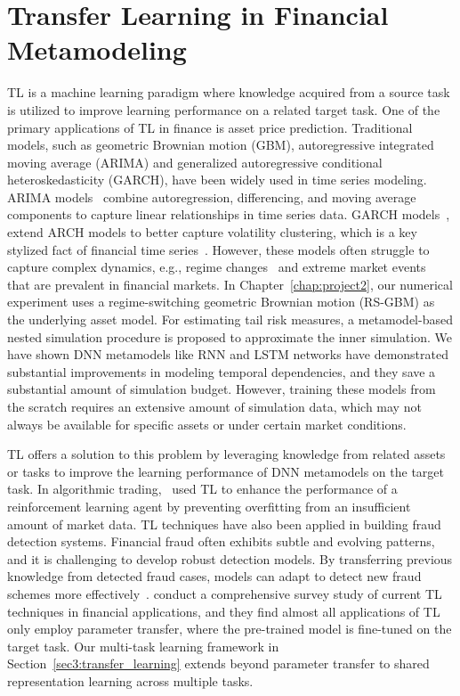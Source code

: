 \section{Transfer Learning in Financial Metamodeling} \label{sec3:background}

TL is a machine learning paradigm where knowledge acquired from a source task is utilized to improve learning performance on a related target task.
One of the primary applications of TL in finance is asset price prediction. 
Traditional models, such as geometric Brownian motion (GBM), autoregressive integrated moving average (ARIMA) and generalized autoregressive conditional heteroskedasticity (GARCH), have been widely used in time series modeling.
ARIMA models~\citep{box1970distribution} combine autoregression, differencing, and moving average components to capture linear relationships in time series data.
GARCH models~\citep{bollerslev1990modelling}, extend ARCH models to better capture volatility clustering, which is a key stylized fact of financial time series~\citep{cont2001empirical}.
However, these models often struggle to capture complex dynamics, e.g., regime changes~\citep{hamilton1989new} and extreme market events~\citep{embrechts2013modelling} that are prevalent in financial markets.
In Chapter~\ref{chap:project2}, our numerical experiment uses a regime-switching geometric Brownian motion (RS-GBM) as the underlying asset model.
For estimating tail risk measures, a metamodel-based nested simulation procedure is proposed to approximate the inner simulation.
We have shown DNN metamodels like RNN and LSTM networks have demonstrated substantial improvements in modeling temporal dependencies, and they save a substantial amount of simulation budget.
However, training these models from the scratch requires an extensive amount of simulation data, which may not always be available for specific assets or under certain market conditions.

TL offers a solution to this problem by leveraging knowledge from related assets or tasks to improve the learning performance of DNN metamodels on the target task.
In algorithmic trading,~\cite{jeong2019improving} used TL to enhance the performance of a reinforcement learning agent by preventing overfitting from an insufficient amount of market data.
TL techniques have also been applied in building fraud detection systems. 
Financial fraud often exhibits subtle and evolving patterns, and it is challenging to develop robust detection models.
By transferring previous knowledge from detected fraud cases, models can adapt to detect new fraud schemes more effectively~\citep{lebichot2021transfer}.
\cite{yan2024comprehensive} conduct a comprehensive survey study of current TL techniques in financial applications, and they find almost all applications of TL only employ parameter transfer, where the pre-trained model is fine-tuned on the target task.
Our multi-task learning framework in Section~\ref{sec3:transfer_learning} extends beyond parameter transfer to shared representation learning across multiple tasks.

